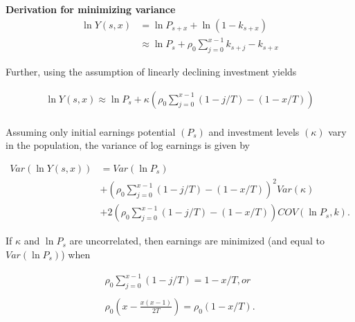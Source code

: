 \begin{frame}\textbf{Derivation for minimizing variance}\vspace{0.3cm}
	\begin{align*}
	\ln{Y(s,x)} & = \ln{P_{s+x}} + \ln{(1 - k_{s+x})} \\
	& \approx \ln{P_s} + \rho_0 \sum^{x - 1}_{j=0} k_{s+j} - k_{s+x}
	\end{align*}

	Further, using the assumption of linearly declining investment yields

	\begin{align*}
	\ln{Y(s,x)} \approx \ln{P_s} + \kappa \left(\rho_0 \sum^{x - 1}_{j=0} (1 - j/T) - (1 - x/T)\right) \\
	\end{align*}
\end{frame}
\begin{frame}
	Assuming only initial earnings potential $(P_s)$ and investment levels $(\kappa)$ vary in the population, the variance of log earnings is given by

	\begin{align*}
	Var(\ln{Y(s,x)}) & = Var(\ln{P_s}) \\
	& + \left(\rho_0 \sum^{x - 1}_{j=0} (1 - j/T) - (1 - x/T)\right)^2 Var(\kappa) \\
	& + 2\left(\rho_0 \sum^{x - 1}_{j=0} (1 - j/T) - (1 - x/T)\right) COV(\ln{P_s},k).
	\end{align*}
\end{frame}
\begin{frame}
	If $\kappa$ and $\ln{P_s}$ are uncorrelated, then earnings are minimized (and equal to $Var(\ln{P_s})$)
	when

	\begin{align*}
	\rho_0 \sum^{x - 1}_{j=0} (1 - j/T) = 1 - x/T, or \\
	\\
	\rho_0\left(x - \frac{x(x - 1)}{2T}\right) = \rho_0(1 - x/T).
	\end{align*}
\end{frame}
